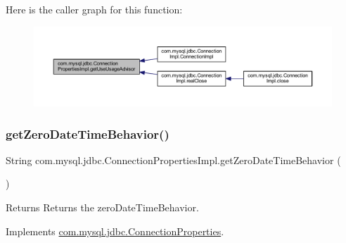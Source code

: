 Here is the caller graph for this function\+:\nopagebreak
\begin{figure}[H]
\begin{center}
\leavevmode
\includegraphics[width=350pt]{classcom_1_1mysql_1_1jdbc_1_1_connection_properties_impl_a9b3b207c5c07bd5443fb9788dc800539_icgraph}
\end{center}
\end{figure}
\mbox{\label{classcom_1_1mysql_1_1jdbc_1_1_connection_properties_impl_afdf94172a5573fd5993f1253bf82ac20}} 
\subsubsection{\texorpdfstring{get\+Zero\+Date\+Time\+Behavior()}{getZeroDateTimeBehavior()}}
{\footnotesize\ttfamily String com.\+mysql.\+jdbc.\+Connection\+Properties\+Impl.\+get\+Zero\+Date\+Time\+Behavior (\begin{DoxyParamCaption}{ }\end{DoxyParamCaption})}

\begin{DoxyReturn}{Returns}
Returns the zero\+Date\+Time\+Behavior. 
\end{DoxyReturn}


Implements \mbox{\hyperlink{interfacecom_1_1mysql_1_1jdbc_1_1_connection_properties_a1101064e308d3d8aabe9560851a5d6b6}{com.\+mysql.\+jdbc.\+Connection\+Properties}}.

